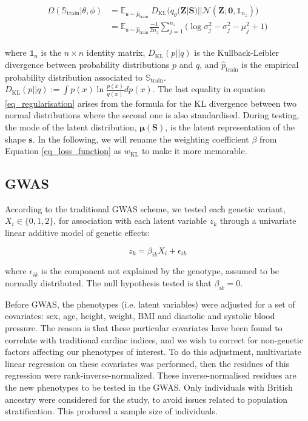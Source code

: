 \begin{align}
\begin{split}
\Omega(\mathbb{S}_\text{train}|\theta, \phi)&= \mathbb{E}_{\mathbf{s}\sim\hat{p}_{\text{train}}}\
D_{\text{KL}}\Big(q_{\theta}(\textbf{Z}|\textbf{S})||\mathcal{N}(\mathbf{Z};\mathbf{0}, \mathbb{1}_{n_z})\Big)\\
&=\mathbb{E}_{\mathbf{s}\sim\hat{p}_{\text{train}}}
\frac{-1}{2n_z}\sum_{j=1}^{n_z}\Big(\log\sigma^2_j-\sigma^2_j-\mu^2_j+1\Big)
\label{eq_regularisation}
\end{split}
\end{align}

\noindent where $\mathbb{1}_{n}$ is the $n\times n$ identity matrix, $D_{\text{KL}}(p||q)$ is the Kullback-Leibler divergence between probability distributions $p$ and $q$, and $\hat{p}_{\text{train}}$ is the empirical probability distribution associated to $\mathbb{S}_\text{train}$.
$D_{\text{KL}}(p||q):=\int p(x)\ln{\frac{p(x)}{q(x)}}dp(x)$. The last equality in equation \ref{eq_regularisation} arises
from the formula for the KL divergence between two normal distributions where the second one is also standardised. During testing, the mode of the latent distribution, $\pmb{\mu}(\textbf{S})$, is the latent representation of the shape $\textbf{s}$. In the following, we will rename the weighting coefficient $\beta$ from Equation \ref{eq_loss_function} as $w_{\text{KL}}$ to make it more memorable.

\subsection{GWAS}
According to the traditional GWAS scheme, we tested each genetic variant, $X_i\in\{0,1,2\}$, for association with each latent variable $z_k$ through a univariate linear additive model of genetic effects:

\begin{equation}
z_k = \beta_{ik}X_i+\epsilon_{ik}
\label{eq_gwas}
\end{equation}

\noindent where $\epsilon_{ik}$ is the component not explained by the genotype, assumed to be normally distributed. The null hypothesis tested is that $\beta_{ik}=0$. 

Before GWAS, the phenotypes (i.e. latent variables) were adjusted for a set of covariates: sex, age, height, weight, BMI and diastolic and systolic blood pressure. The reason is that these particular covariates have been found to correlate with traditional cardiac indices, and we wish to correct for non-genetic factors affecting our phenotypes of interest. To do this adjustment, multivariate linear regression on these covariates was performed, then the residues of this regression were rank-inverse-normalized. These inverse-normalised residues are the new phenotypes to be tested in the GWAS. Only individuals with British ancestry were considered for the study, to avoid issues related to population stratification. This produced a sample size of \NCMRGBR individuals.

